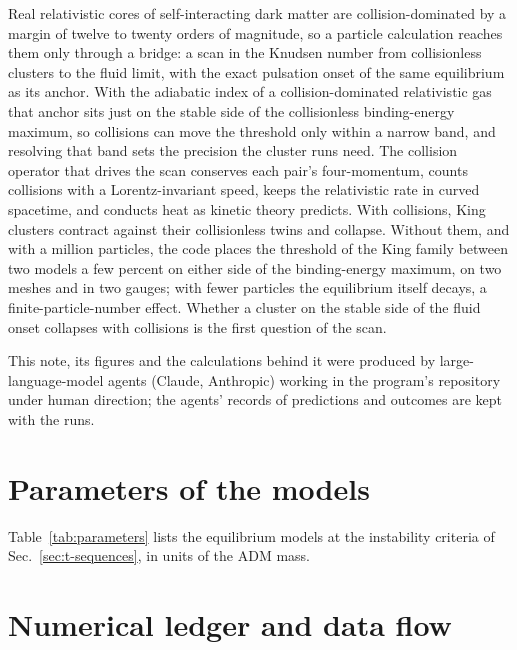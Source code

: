 \documentclass[aps,prd,twocolumn,10pt,superscriptaddress,nofootinbib,longbibliography,floatfix]{revtex4-2}
\begin{document}
Real relativistic cores of self-interacting dark matter are collision-dominated by a margin of twelve to twenty orders of magnitude, so a particle calculation reaches them only through a bridge: a scan in the Knudsen number from collisionless clusters to the fluid limit, with the exact pulsation onset of the same equilibrium as its anchor. With the adiabatic index of a collision-dominated relativistic gas that anchor sits just on the stable side of the collisionless binding-energy maximum, so collisions can move the threshold only within a narrow band, and resolving that band sets the precision the cluster runs need. The collision operator that drives the scan conserves each pair's four-momentum, counts collisions with a Lorentz-invariant speed, keeps the relativistic rate in curved spacetime, and conducts heat as kinetic theory predicts. With collisions, King clusters contract against their collisionless twins and collapse. Without them, and with a million particles, the code places the threshold of the King family between two models a few percent on either side of the binding-energy maximum, on two meshes and in two gauges; with fewer particles the equilibrium itself decays, a finite-particle-number effect. Whether a cluster on the stable side of the fluid onset collapses with collisions is the first question of the scan.

\begin{acknowledgments}
This note, its figures and the calculations behind it were produced by large-language-model agents (Claude, Anthropic) working in the program's repository under human direction; the agents' records of predictions and outcomes are kept with the runs.
\end{acknowledgments}

\appendix

\section{Parameters of the models}\label{app:parameters}

Table~\ref{tab:parameters} lists the equilibrium models at the instability criteria of Sec.~\ref{sec:t-sequences}, in units of the ADM mass.



\section{Numerical ledger and data flow}\label{app:ledger}
\end{document}
